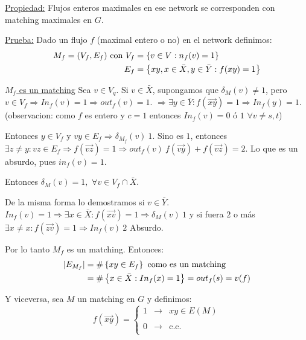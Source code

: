 \documentclass[12pt,a4paper]{article}
\begin{document}
\underline{Propiedad:} Flujos enteros maximales en ese network se corresponden 
con matching maximales en $G$.
\medskip

\underline{Prueba:} Dado un flujo $f$ (maximal entero o no) en el network definimos:
\begin{align*}
    M_{f} = (V_{f}, E_{f})\,\, \text{con}\,\, V_{f} &= \left\lbrace v \in V: n_{f}(v)=1 \right\rbrace\\
    E_{f} &= \left\lbrace xy, x\in \bar{X}, y\in \bar{Y}: f(xy)=1 \right\rbrace
\end{align*}

\underline{$M_{f}$ es un matching} Sea $v \in V_{q}$. Si $v \in \bar{X}$, supongamos 
que $\delta_{M}(v) \neq 1$, pero $v\in V_{f} \Rightarrow In_{f}(v)=1 \Rightarrow out_{f}(v)=1$.
$\Rightarrow \exists y \in \bar{Y}: f(\overrightarrow{xy}) = 1 \Rightarrow In_{f}(y)=1$.
(observacion: como $f$ es entero y $c=1$ entonces $In_{f}(v)=0$ ó $1\,\, \forall v \neq s,t$)
\medskip

Entonces $y\in V_{f}$ y $vy \in E_{f} \Rightarrow \delta_{M_{f}}(v) \> 1$. Sino es $1$,
entonces $\exists z \neq y: vz \in E_{f} \Rightarrow f(\overrightarrow{vz}) = 1 \Rightarrow out_{f}(v) \> f(\overrightarrow{vy}) + f(\overrightarrow{vz}) = 2$.
Lo que es un absurdo, pues $in_{f}(v) = 1$.
\medskip

Entonces $\delta_{M}(v) =1, \,\, \forall v\in V_{f} \cap \bar{X}$.
\medskip

De la misma forma lo demostramos si $v \in \bar{Y}$.
$In_{f}(v)=1 \Rightarrow \exists x\in \bar{X}: f(\overrightarrow{xv}) = 1 \Rightarrow \delta_{M}(v) \> 1$ 
y si fuera $2$ o más $\exists x \neq x: f(\overrightarrow{zv}) =1 \Rightarrow In_{f}(v) \> 2$ Absurdo.
\medskip

Por lo tanto $M_{f}$ es un matching. Entonces:
\begin{align*}
    |E_{M_{f}}|&=\# \left\lbrace xy\in E_{f} \right\rbrace\,\, \text{como es un matching}\\
    &=\# \left\lbrace x \in \bar{X}: In_{f}(x)=1 \right\rbrace = out_{f}(s) = v(f)\\
\end{align*}

Y viceversa, sea $M$ un matching en $G$ y definimos:
$$f(\overrightarrow{xy})= \left\{ \begin{array}{lcc}
    1 & \to & xy \in E(M)\\
    \\ 0& \to & \text{c.c.}\\
    \end{array}
    \right.$$
\end{document}
